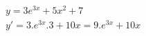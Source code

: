 \begin{ex}
\begin{align}
&y=3e^{3x}+5x^2+7\nonumber\\
&y'=3.e^{3x}.3+10x=9.e^{3x}+10x\nonumber
\end{align}
\end{ex}